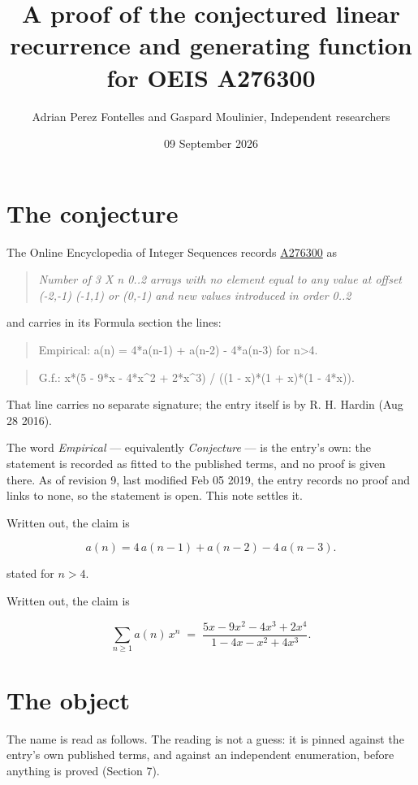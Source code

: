 \documentclass[11pt]{article}
\title{A proof of the conjectured linear recurrence and generating function for OEIS A276300}
\author{Adrian Perez Fontelles and Gaspard Moulinier, Independent researchers}
\date{09 September 2026}
\theoremstyle{definition}
\begin{document}
\maketitle
\section{The conjecture}

The Online Encyclopedia of Integer Sequences records \href{https://oeis.org/A276300}{A276300} as

\begin{quote}\itshape Number of 3 X n 0..2 arrays with no element equal to any value at offset (-2,-1) (-1,1) or (0,-1) and new values introduced in order 0..2\end{quote}

and carries in its Formula section the lines:

\begin{quote}\ttfamily Empirical: a(n) = 4*a(n-1) + a(n-2) - 4*a(n-3) for n>4.\end{quote}

\begin{quote}\ttfamily G.f.: x*(5 - 9*x - 4*x\textasciicircum{}2 + 2*x\textasciicircum{}3) / ((1 - x)*(1 + x)*(1 - 4*x)).\end{quote}

That line carries no separate signature; the entry itself is by R. H. Hardin (Aug 28 2016).

The word {\itshape Empirical} --- equivalently {\itshape Conjecture} --- is the entry's own: the statement is recorded as fitted to the published terms, and no proof is given there. As of revision 9, last modified Feb 05 2019, the entry records no proof and links to none, so the statement is open. This note settles it.

Written out, the claim is

\[a(n) = 4\,a(n-1) + a(n-2) - 4\,a(n-3).\]

stated for $n > 4$.

Written out, the claim is

\[\sum_{n \ge 1} a(n)\,x^n \;=\; \frac{5x - 9x^{2} - 4x^{3} + 2x^{4}}{1 - 4x - x^{2} + 4x^{3}}.\]

\section{The object}

The name is read as follows. The reading is not a guess: it is pinned against the entry's own published terms, and against an independent enumeration, before anything is proved (Section 7).
\end{document}
